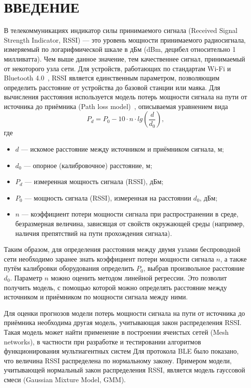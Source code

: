 \part*{ВВЕДЕНИЕ}

В телекоммуникациях индикатор силы принимаемого сигнала (Received Signal Strength Indicator, RSSI) --- это уровень мощности принимаемого радиосигнала, измеряемый по логарифмической шкале в дБм (dBm, децибел относительно 1 милливатта). Чем выше данное значение, тем качественнее сигнал, принимаемый от некоторого узла сети. Для устройств, работающих по стандартам Wi-Fi и Bluetooth 4.0~\cite{net}, RSSI является единственным параметром, позволяющим определить расстояние от устройства до базовой станции или маяка. Для вычисления расстояния используется модель потерь мощности сигнала на пути от источника до приёмника (Path loss model)~\cite{plm}, описываемая уравнением вида
\begin{equation}
	P_d = P_0 - 10 \cdot n \cdot lg⁡(\frac{d}{d_0}),
\end{equation}
где
\begin{itemize}[label*=---]
	\item $d$ --- искомое расстояние между источником и приёмником сигнала, м;
	\item $d_0$ --- опорное (калибровочное) расстояние, м;
	\item $P_d$ --- измеренная мощность сигнала (RSSI), дБм;
	\item $P_0$ --- мощность сигнала (RSSI), измеренная на расстоянии $d_0$, дБм;
	\item $n$ --- коэффициент потери мощности сигнала при распространении в среде, безразмерная величина, зависящая от свойств окружающей среды (например, наличия препятствий на пути прохождения сигнала).
\end{itemize}

Таким образом, для определения расстояния между двумя узлами беспроводной сети необходимо заранее знать коэффициент потери мощности сигнала $n$, а также путём калибровки оборудования определить $P_0$, выбрав произвольное расстояние $d_0$. Параметр $n$ можно оценить методом линейной регрессии. Это позволит получить модель, с помощью которой можно определять расстояние между источником и приёмником по мощности сигнала между ними. 

Для оценки прогнозов модели потерь мощности сигнала на пути от источника до приёмника необходима другая модель, учитывающая закон распределения RSSI. Такая модель может найти применение в построении ячеистых сетей (Mesh networks), в частности при разработке и тестировании алгоритмов функционирования мультиагентных систем  Для протокола BLE было показано, что величина RSSI распределена по нормальному закону\cite{my}. Примером модели, учитывающей нормальный закон распределения RSSI, является модель гауссовой смеси (Gaussian Mixture Model, GMM).

